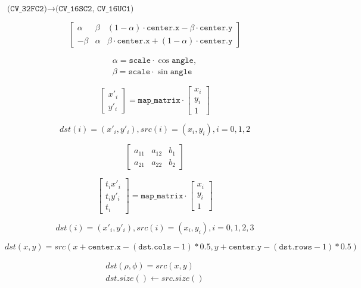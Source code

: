 \documentclass{article}
\begin{document}
$\texttt{(CV_32FC2)} \rightarrow \texttt{(CV_16SC2, CV_16UC1)}$
\pagebreak

\[\begin{bmatrix} \alpha & \beta & (1- \alpha ) \cdot \texttt{center.x} - \beta \cdot \texttt{center.y} \\ - \beta & \alpha & \beta \cdot \texttt{center.x} + (1- \alpha ) \cdot \texttt{center.y} \end{bmatrix}\]
\pagebreak

\[\begin{array}{l} \alpha = \texttt{scale} \cdot \cos \texttt{angle} , \\ \beta = \texttt{scale} \cdot \sin \texttt{angle} \end{array}\]
\pagebreak

\[\begin{bmatrix} x'_i \\ y'_i \end{bmatrix} = \texttt{map_matrix} \cdot \begin{bmatrix} x_i \\ y_i \\ 1 \end{bmatrix}\]
\pagebreak

\[dst(i)=(x'_i,y'_i), src(i)=(x_i, y_i), i=0,1,2\]
\pagebreak

\[\begin{bmatrix} a_{11} & a_{12} & b_1 \\ a_{21} & a_{22} & b_2 \end{bmatrix}\]
\pagebreak

\[\begin{bmatrix} t_i x'_i \\ t_i y'_i \\ t_i \end{bmatrix} = \texttt{map_matrix} \cdot \begin{bmatrix} x_i \\ y_i \\ 1 \end{bmatrix}\]
\pagebreak

\[dst(i)=(x'_i,y'_i), src(i)=(x_i, y_i), i=0,1,2,3\]
\pagebreak

\[dst(x, y) = src(x + \texttt{center.x} - ( \texttt{dst.cols} -1)*0.5, y + \texttt{center.y} - ( \texttt{dst.rows} -1)*0.5)\]
\pagebreak

\[\begin{array}{l} dst( \rho , \phi ) = src(x,y) \\ dst.size() \leftarrow src.size() \end{array}\]
\pagebreak
\end{document}
